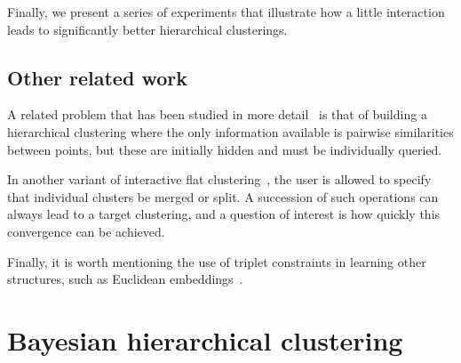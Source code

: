 Finally, we present a series of experiments that illustrate how a little interaction leads to significantly better hierarchical clusterings.

\iffalse

\subsection{Other related work}

A related problem that has been studied in more detail~\cite{ZB00,EDSN11,KBXS12} is that of building a hierarchical clustering where the only information available is pairwise similarities between points, but these are initially hidden and must be individually queried.

In another variant of interactive flat clustering~\cite{BB08,AZ10,ABV14}, the user is allowed to specify that individual clusters be merged or split. A succession of such operations can always lead to a target clustering, and a question of interest is how quickly this convergence can be achieved.

Finally, it is worth mentioning the use of triplet constraints in learning other structures, such as Euclidean embeddings~\cite{BG05}.

\section{Bayesian hierarchical clustering}


